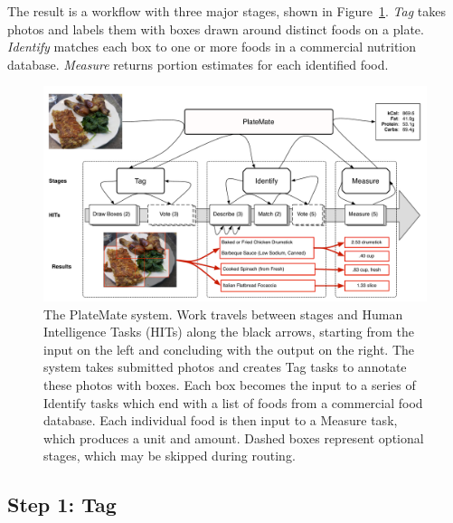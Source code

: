The result is a workflow with three major stages, shown in
Figure~\ref{fig:system}. \emph{Tag} takes photos and labels them with
boxes drawn around distinct foods on a plate.  \emph{Identify} matches
each box to one or more foods in a commercial nutrition database.
\emph{Measure} returns portion estimates for each identified food.

\begin{figure}[t]
\begin{center}
   \includegraphics[width=\linewidth]{figs/diagram.pdf}
   \caption{The PlateMate system. Work travels between stages and
     Human Intelligence Tasks (HITs) along the black arrows, starting
     from the input on the left and concluding with the output on the
     right. The system takes submitted photos and creates Tag tasks to
     annotate these photos with boxes.  Each box becomes the input to
     a series of Identify tasks which end with a list of foods from a
     commercial food database.  Each individual food is then input to
     a Measure task, which produces a unit and amount.  Dashed boxes
     represent optional stages, which may be skipped during routing.}
   \label{fig:system}
\end{center}
\end{figure}

\subsection{Step 1: Tag}

